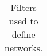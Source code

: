 \begin{table}[]
\begin{tabular}{@{}llll@{}}
\\ \bottomrule
\end{tabular}
\caption{ Filters used to define networks.}
\label{table:filters}
\end{table}

%
%
